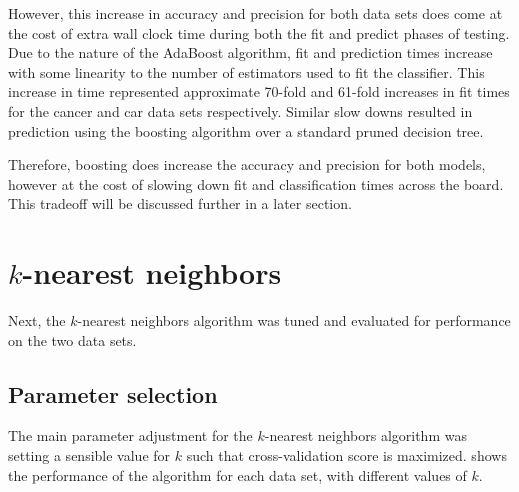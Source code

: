 \documentclass{article}
\begin{document}
    However, this increase in accuracy and precision for both data sets does come at the cost of extra wall clock time during both the fit and predict phases of testing. Due to the nature of the AdaBoost algorithm, fit and prediction times increase with some linearity to the number of estimators used to fit the classifier. This increase in time represented approximate 70-fold and 61-fold increases in fit times for the cancer and car data sets respectively. Similar slow downs resulted in prediction using the boosting algorithm over a standard pruned decision tree.

    Therefore, boosting does increase the accuracy and precision for both models, however at the cost of slowing down fit and classification times across the board. This tradeoff will be discussed further in a later section.

    \section{$k$-nearest neighbors}
    Next, the $k$-nearest neighbors algorithm was tuned and evaluated for performance on the two data sets.

    \subsection{Parameter selection}
    The main parameter adjustment for the $k$-nearest neighbors algorithm was setting a sensible value for $k$ such that cross-validation score is maximized.  shows the performance of the algorithm for each data set, with different values of $k$.
\end{document}
